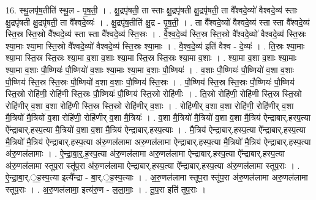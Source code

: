 \documentclass[17pt]{extarticle}
\begin{document}
16. स्थू॒लपृ॑ष॒तीति॑ स्थू॒ल - पृ॒ष॒ती॒ । . क्षु॒द्रपृ॑षती॒ ता स्ताः क्षु॒द्रपृ॑षती क्षु॒द्रपृ॑षती॒ ता वै᳚श्वदे॒व्यो॑ वैश्वदे॒व्य॑ स्ताः क्षु॒द्रपृ॑षती क्षु॒द्रपृ॑षती॒ ता वै᳚श्वदे॒व्यः॑ । . क्षु॒द्रपृ॑ष॒तीति॑ क्षु॒द्र - पृ॒ष॒ती॒ । . ता वै᳚श्वदे॒व्यो॑ वैश्वदे॒व्य॑ स्ता स्ता वै᳚श्वदे॒व्य॑ स्ति॒स्र स्ति॒स्रो वै᳚श्वदे॒व्य॑ स्ता स्ता वै᳚श्वदे॒व्य॑ स्ति॒स्रः । . वै॒श्व॒दे॒व्य॑ स्ति॒स्र स्ति॒स्रो वै᳚श्वदे॒व्यो॑ वैश्वदे॒व्य॑ स्ति॒स्रः श्या॒माः श्या॒मा स्ति॒स्रो वै᳚श्वदे॒व्यो॑ वैश्वदे॒व्य॑ स्ति॒स्रः श्या॒माः । . वै॒श्व॒दे॒व्य॑ इति॑ वैश्व - दे॒व्यः॑ । . ति॒स्रः श्या॒माः श्या॒मा स्ति॒स्र स्ति॒स्रः श्या॒मा व॒शा व॒शाः श्या॒मा स्ति॒स्र स्ति॒स्रः श्या॒मा व॒शाः । . श्या॒मा व॒शा व॒शाः श्या॒माः श्या॒मा व॒शाः पौ॒ष्णियः॑ पौ॒ष्णियो॑ व॒शाः श्या॒माः श्या॒मा व॒शाः पौ॒ष्णियः॑ । . व॒शाः पौ॒ष्णियः॑ पौ॒ष्णियो॑ व॒शा व॒शाः पौ॒ष्णिय॑ स्ति॒स्र स्ति॒स्रः पौ॒ष्णियो॑ व॒शा व॒शाः पौ॒ष्णिय॑ स्ति॒स्रः । . पौ॒ष्णिय॑ स्ति॒स्र स्ति॒स्रः पौ॒ष्णियः॑ पौ॒ष्णिय॑ स्ति॒स्रो रोहि॑णी॒ रोहि॑णी स्ति॒स्रः पौ॒ष्णियः॑ पौ॒ष्णिय॑ स्ति॒स्रो रोहि॑णीः । . ति॒स्रो रोहि॑णी॒ रोहि॑णी स्ति॒स्र स्ति॒स्रो रोहि॑णीर् व॒शा व॒शा रोहि॑णी स्ति॒स्र 
स्ति॒स्रो रोहि॑णीर् व॒शाः । . रोहि॑णीर् व॒शा व॒शा रोहि॑णी॒ रोहि॑णीर् व॒शा मै॒त्रियो॑ मै॒त्रियो॑ व॒शा रोहि॑णी॒ रोहि॑णीर् व॒शा मै॒त्रियः॑ । . व॒शा मै॒त्रियो॑ मै॒त्रियो॑ व॒शा व॒शा मै॒त्रिय॑ ऐन्द्राबार्.हस्प॒त्या ऐ᳚न्द्राबार्.हस्प॒त्या मै॒त्रियो॑ व॒शा व॒शा मै॒त्रिय॑ ऐन्द्राबार्.हस्प॒त्याः । . मै॒त्रिय॑ ऐन्द्राबार्.हस्प॒त्या ऐ᳚न्द्राबार्.हस्प॒त्या मै॒त्रियो॑ मै॒त्रिय॑ ऐन्द्राबार्.हस्प॒त्या अ॑रु॒णल॑लामा अरु॒णल॑लामा ऐन्द्राबार्.हस्प॒त्या मै॒त्रियो॑ मै॒त्रिय॑ ऐन्द्राबार्.हस्प॒त्या अ॑रु॒णल॑लामाः । . ऐ॒न्द्रा॒बा॒र्॒.ह॒स्प॒त्या अ॑रु॒णल॑लामा अरु॒णल॑लामा ऐन्द्राबार्.हस्प॒त्या ऐ᳚न्द्राबार्.हस्प॒त्या अ॑रु॒णल॑लामा स्तूप॒रा स्तू॑प॒रा अ॑रु॒णल॑लामा ऐन्द्राबार्.हस्प॒त्या ऐ᳚न्द्राबार्.हस्प॒त्या अ॑रु॒णल॑लामा स्तूप॒राः । . ऐ॒न्द्रा॒बा॒र्.॒ह॒स्प॒त्या इत्यै᳚न्द्रा - बा॒र्.॒ह॒स्प॒त्याः । . अ॒रु॒णल॑लामा स्तूप॒रा स्तू॑प॒रा अ॑रु॒णल॑लामा अरु॒णल॑लामा स्तूप॒राः । . अ॒रु॒णल॑लामा॒ इत्य॑रु॒ण - ल॒ला॒माः॒ । . तू॒प॒रा इति॑ तूप॒राः । \newline
\pagebreak
{}
\end{document}

